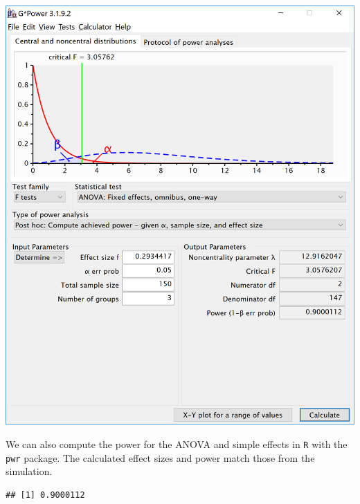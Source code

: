 \documentclass[]{book}
\newenvironment{Shaded}{\begin{snugshade}}{\end{snugshade}}
\newcommand{\DataTypeTok}[1]{\textcolor[rgb]{0.13,0.29,0.53}{#1}}
\newcommand{\DecValTok}[1]{\textcolor[rgb]{0.00,0.00,0.81}{#1}}
\newcommand{\FloatTok}[1]{\textcolor[rgb]{0.00,0.00,0.81}{#1}}
\newcommand{\KeywordTok}[1]{\textcolor[rgb]{0.13,0.29,0.53}{\textbf{#1}}}
\newcommand{\NormalTok}[1]{#1}
\newcommand{\OperatorTok}[1]{\textcolor[rgb]{0.81,0.36,0.00}{\textbf{#1}}}
\newcommand{\StringTok}[1]{\textcolor[rgb]{0.31,0.60,0.02}{#1}}
\begin{document}
\includegraphics{screenshots/gpower_7.png}

We can also compute the power for the ANOVA and simple effects in \texttt{R} with the \texttt{pwr} package. The calculated effect sizes and power match those from the simulation.

\begin{Shaded}
\end{Shaded}

\begin{verbatim}
## [1] 0.9000112
\end{verbatim}
\end{document}

